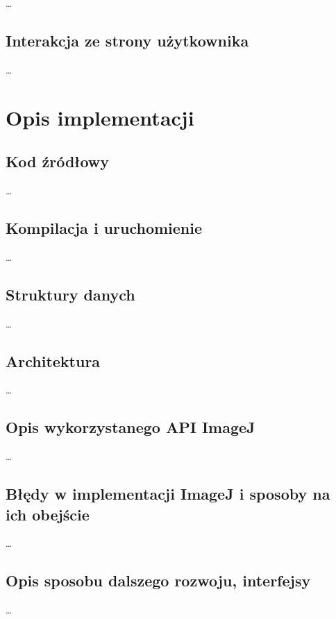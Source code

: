 \documentclass[declaration,shortabstract,mgr]{iithesis}
\begin{document}
\ldots %


\section{Interakcja ze strony użytkownika}

\ldots %



\chapter{Opis implementacji}

\section{Kod źródłowy}
\ldots %
\section{Kompilacja i uruchomienie}
\ldots %
\section{Struktury danych}
\ldots %
\section{Architektura}
\ldots %
\section{Opis wykorzystanego API ImageJ}
\ldots %
\section{Błędy w implementacji ImageJ i sposoby na ich obejście}
\ldots %
\section{Opis sposobu dalszego rozwoju, interfejsy}
\ldots %
\end{document}
